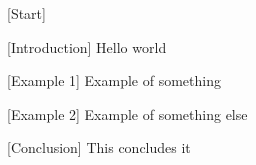 \documentclass{article}
\begin{document}
[Start]

[Introduction]
Hello world

[Example 1]
Example of something

[Example 2]
Example of something else

[Conclusion]
This concludes it
\end{document}
